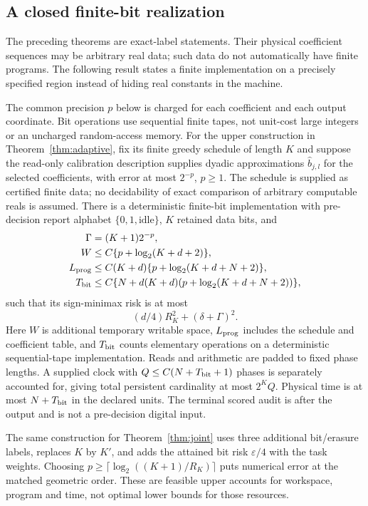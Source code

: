 \subsection{A closed finite-bit realization}
The preceding theorems are exact-label statements. Their physical coefficient sequences may be arbitrary real data; such data do not automatically have finite programs. The following result states a finite implementation on a precisely specified region instead of hiding real constants in the machine.

\begin{theorem}\label{thm:digital}
The common precision $p$ below is charged for each coefficient and each output coordinate. Bit operations use sequential finite tapes, not unit-cost large integers or an uncharged random-access memory.
For the upper construction in Theorem~\ref{thm:adaptive}, fix its finite greedy schedule of length $K$ and suppose the read-only calibration description supplies dyadic approximations $\widehat b_{j,l}$ for the selected coefficients, with error at most $2^{-p}$, $p\ge1$. The schedule is supplied as certified finite data; no decidability of exact comparison of arbitrary computable reals is assumed. There is a deterministic finite-bit implementation with pre-decision report alphabet $\{0,1,\mathrm{idle}\}$, $K$ retained data bits, and
\begin{align}
 \Gamma&=(K+1)2^{-p},\label{eq:digitalerror}\\
 W&\le C\{p+\log_2(K+d+2)\},\label{eq:workspace}\\
 L_{\rm prog}&\le C(K+d)\{p+\log_2(K+d+N+2)\},\label{eq:program}\\
 T_{\rm bit}&\le C\{N+d(K+d)(p+\log_2(K+d+N+2))\},\label{eq:runtime}
\end{align}
such that its sign-minimax risk is at most
\begin{equation}\label{eq:digitalrisk}
 (d/4)R_K^2+(\delta+\Gamma)^2.
\end{equation}
Here $W$ is additional temporary writable space, $L_{\rm prog}$ includes the schedule and coefficient table, and $T_{\rm bit}$ counts elementary operations on a deterministic sequential-tape implementation. Reads and arithmetic are padded to fixed phase lengths. A supplied clock with $Q\le C(N+T_{\rm bit}+1)$ phases is separately accounted for, giving total persistent cardinality at most $2^KQ$. Physical time is at most $N+T_{\rm bit}$ in the declared units. The terminal scored audit is after the output and is not a pre-decision digital input.

The same construction for Theorem~\ref{thm:joint} uses three additional bit/erasure labels, replaces $K$ by $K'$, and adds the attained bit risk $\varepsilon/4$ with the task weights. Choosing $p\ge\lceil\log_2((K+1)/R_K)\rceil$ puts numerical error at the matched geometric order. These are feasible upper accounts for workspace, program and time, not optimal lower bounds for those resources.
\end{theorem}

